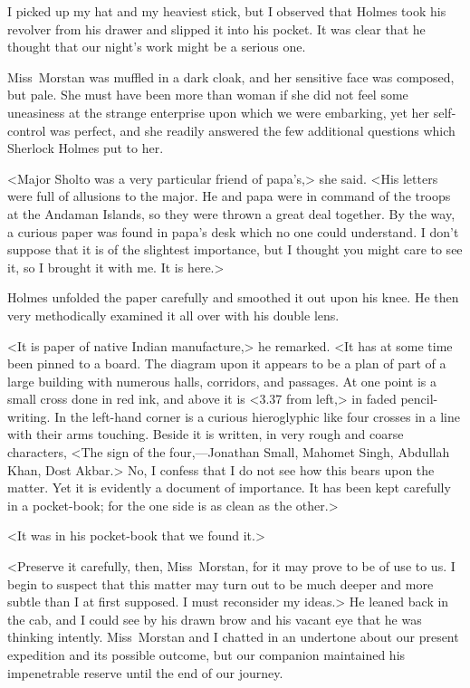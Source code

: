 I picked up my hat and my heaviest stick, but I observed that Holmes took his revolver from his drawer and slipped it into his pocket. It was clear that he thought that our night's work might be a serious one.

Miss~Morstan was muffled in a dark cloak, and her sensitive face was composed, but pale. She must have been more than woman if she did not feel some uneasiness at the strange enterprise upon which we were embarking, yet her self-control was perfect, and she readily answered the few additional questions which Sherlock Holmes put to her.

<Major Sholto was a very particular friend of papa's,> she said. <His letters were full of allusions to the major. He and papa were in command of the troops at the Andaman Islands, so they were thrown a great deal together. By the way, a curious paper was found in papa's desk which no one could understand. I don't suppose that it is of the slightest importance, but I thought you might care to see it, so I brought it with me. It is here.>

Holmes unfolded the paper carefully and smoothed it out upon his knee. He then very methodically examined it all over with his double lens.

<It is paper of native Indian manufacture,> he remarked. <It has at some time been pinned to a board. The diagram upon it appears to be a plan of part of a large building with numerous halls, corridors, and passages. At one point is a small cross done in red ink, and above it is <3.37 from left,> in faded pencil-writing. In the left-hand corner is a curious hieroglyphic like four crosses in a line with their arms touching. Beside it is written, in very rough and coarse characters, <The sign of the four,—Jonathan Small, Mahomet Singh, Abdullah Khan, Dost Akbar.> No, I confess that I do not see how this bears upon the matter. Yet it is evidently a document of importance. It has been kept carefully in a pocket-book; for the one side is as clean as the other.>

<It was in his pocket-book that we found it.>

<Preserve it carefully, then, Miss~Morstan, for it may prove to be of use to us. I begin to suspect that this matter may turn out to be much deeper and more subtle than I at first supposed. I must reconsider my ideas.> He leaned back in the cab, and I could see by his drawn brow and his vacant eye that he was thinking intently. Miss~Morstan and I chatted in an undertone about our present expedition and its possible outcome, but our companion maintained his impenetrable reserve until the end of our journey.

